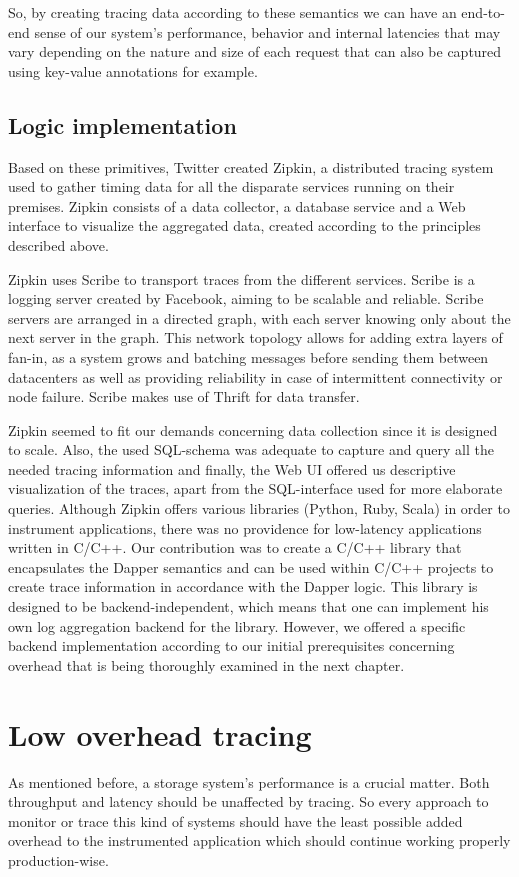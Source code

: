 \documentclass[a4paper,10pt,twocolumn]{article}
\begin{document}
So, by creating tracing data according to these semantics we can have an
end-to-end sense of our system's performance, behavior and internal latencies
that may vary depending on the nature and size of each request that can also be
captured using key-value annotations for example.

\subsection{Logic implementation} Based on these primitives, Twitter created
Zipkin\cite{zipkin}, a distributed tracing system used to gather timing data for
all the disparate services running on their premises. Zipkin consists of a data
collector, a database service and a Web interface to visualize the aggregated
data, created according to the principles described above.

Zipkin uses Scribe\cite{scribe} to transport traces from the different services.
Scribe is a logging server created by Facebook, aiming to be scalable and
reliable. Scribe servers are arranged in a directed graph, with each server
knowing only about the next server in the graph. This network topology allows
for adding extra layers of fan-in, as a system grows and batching messages
before sending them between datacenters as well as providing reliability in case
of intermittent connectivity or node failure. Scribe makes use of
Thrift\cite{thift} for data transfer.

Zipkin seemed to fit our demands concerning data collection since it is designed
to scale. Also, the used SQL-schema was adequate to capture and query all the
needed tracing information and finally, the Web UI offered us descriptive
visualization of the traces, apart from the SQL-interface used for more
elaborate queries. Although Zipkin offers various libraries (Python, Ruby,
Scala) in order to instrument applications, there was no providence for
low-latency applications written in C/C++. Our contribution was to create a
C/C++ library that encapsulates the Dapper semantics and can be used within
C/C++ projects to create trace information in accordance with the Dapper logic.
This library is designed to be backend-independent, which means that one can
implement his own log aggregation backend for the library. However, we offered a
specific backend implementation according to our initial prerequisites
concerning overhead that is being thoroughly examined in the next chapter.

\section{Low overhead tracing} As mentioned before, a storage system's
performance is a crucial matter. Both throughput and latency should be
unaffected by tracing. So every approach to monitor or trace this kind of
systems should have the least possible added overhead to the instrumented
application which should continue working properly production-wise.
\end{document}
